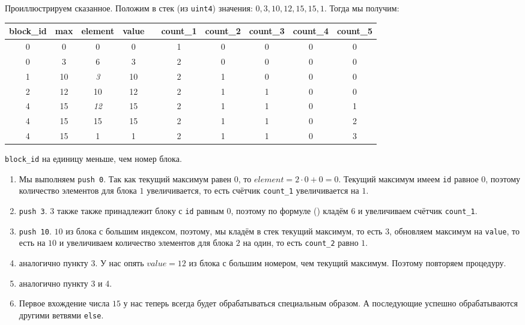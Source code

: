 Проиллюстрируем сказанное. Положим в стек (из \texttt{uint4}) значения: \(0,3,10, 12, 15, 15, 1\). Тогда мы получим:

\begin{table}[H]
    \centering
    \begin{tabular}{|c|c|c|c|c|c|c|c|c|c|}
       \hline block_id & max& element & value & &count_1 &count_2 &count_3 &count_4 &count_5 \\ \hline
         0       & 0  &  0      & 0     & & 1      & 0      & 0      & 0      & 0      \\ \hline
         0       & 3  &  6      & 3     & & 2      & 0      & 0      & 0      & 0      \\ \hline
         1       & 10 &  \textit{3}    & 10    & & 2      & 1      & 0      & 0      & 0      \\ \hline
         2       & 12 & 10      & 12    & & 2      & 1      & 1      & 0      & 0      \\ \hline
         4       & 15 & \textit{12}    & 15    & & 2      & 1      & 1      & 0      & 1      \\ \hline
         4       & 15 & 15      & 15    & & 2      & 1      & 1      & 0      & 2      \\ \hline
         4       & 15 & 1       & 1     & & 2      & 1      & 1      & 0      & 3      \\ \hline
    \end{tabular}
\end{table}

\texttt{block_id} на единицу меньше, чем номер блока.

\begin{enumerate}
    \item  Мы выполняем \texttt{push 0}. Так как текущий максимум равен \(0\), то \(element = 2\cdot 0 + 0 = 0\). Текущий максимум имеем \texttt{id} равное \(0\), поэтому количество элементов для блока \(1\) увеличивается, то есть счётчик \texttt{count_1} увеличивается на \(1\). 
    \item \texttt{push 3}. \(3\) также также принадлежит блоку с \texttt{id} равным \(0\), поэтому по формуле () кладём \(6\) и увеличиваем счётчик \texttt{count_1}.
    \item \texttt{push 10}. \(10\) из блока с большим индексом, поэтому, мы кладём в стек текущий максимум, то есть \(3\), обновляем максимум на \texttt{value}, то есть на \(10\) и увеличиваем количество элементов для блока \(2\) на один, то есть \texttt{count_2} равно \(1\).
    \item аналогично пункту \(3\). У нас опять \(value = 12\) из блока с большим номером, чем текущий максимум. Поэтому повторяем процедуру.
    \item аналогично пункту 3 и 4.
    \item Первое вхождение числа \(15\) у нас теперь всегда будет обрабатываться специальным образом. А последующие успешно обрабатываются другими ветвями \texttt{else}. 
\end{enumerate}

